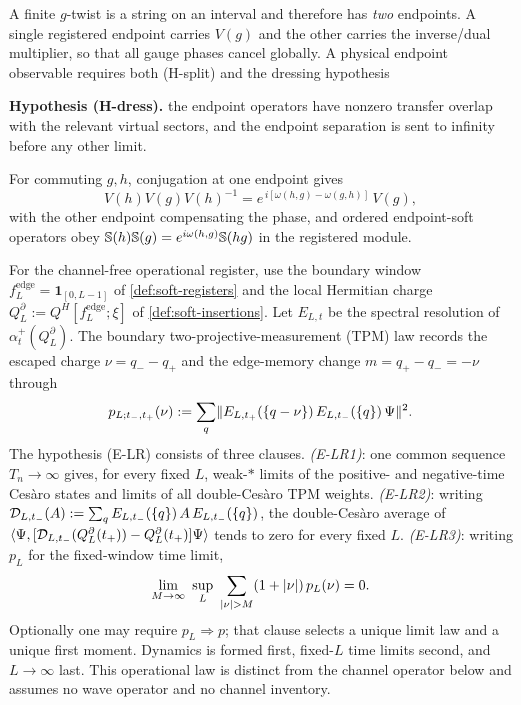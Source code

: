 \begin{definition}\label{def:twist-memory}
A finite $g$-twist is a string on an interval and therefore has \emph{two}
endpoints. A single registered endpoint carries $V(g)$ and the other carries
the inverse/dual multiplier, so that all gauge phases cancel globally. A
physical endpoint observable requires both (H-split) and the dressing
hypothesis

\smallskip
\noindent\textbf{Hypothesis (H-dress).} the endpoint operators have nonzero
transfer overlap with the relevant virtual sectors, and the endpoint
separation is sent to infinity before any other limit.

\smallskip
For commuting $g,h$, conjugation at one endpoint gives
\begin{equation}
  V(h)V(g)V(h)^{-1}=e^{\,i[\omega(h,g)-\omega(g,h)]}\,V(g),
  \label{eq:spt-slant-def}
\end{equation}
with the other endpoint compensating the phase, and ordered endpoint-soft
operators obey $\mathbb{S}(h)\mathbb{S}(g)=e^{i\omega(h,g)}\mathbb{S}(hg)$ in the registered
module.

For the channel-free operational register, use the boundary window
$f^{\mathrm{edge}}_L=\mathbf 1_{[0,L-1]}$ of \cref{def:soft-registers} and the
local Hermitian charge
$Q^{\partial}_{L}:=Q^{H}[f^{\mathrm{edge}}_L;\xi]$ of
\cref{def:soft-insertions}. Let $E_{L,t}$ be the spectral resolution of
$\alpha^{+}_t(Q^{\partial}_{L})$. The boundary two-projective-measurement
(TPM) law records the escaped charge $\nu=q_--q_+$ and the edge-memory change
$m=q_+-q_-=-\nu$ through
\begin{equation}
  p_{L;t_-,t_+}(\nu)
   :=\sum_{q}\lVert E_{L,t_+}(\{q-\nu\})\,E_{L,t_-}(\{q\})\,\Psi\rVert^{2}.
  \label{eq:spt-tpm-law}
\end{equation}
The hypothesis (E-LR) consists of three clauses. \emph{(E-LR1)}: one common
sequence $T_n\to\infty$ gives, for every fixed $L$, weak-$*$ limits of the
positive- and negative-time Ces\`aro states and limits of all double-Ces\`aro
TPM weights. \emph{(E-LR2)}: writing
$\mathcal{D}_{L,t_-}(A):=\sum_q E_{L,t_-}(\{q\})\,A\,E_{L,t_-}(\{q\})$, the
double-Ces\`aro average of
$\langle \Psi,[\mathcal{D}_{L,t_-}(Q^{\partial}_L(t_+))-Q^{\partial}_L(t_+)]\Psi\rangle$
tends to zero for every fixed $L$. \emph{(E-LR3)}: writing $p_L$ for the
fixed-window time limit,
\begin{equation}
  \lim_{M\to\infty}\ \sup_{L}\ \sum_{\abs{\nu}>M}(1+\abs{\nu})\,p_L(\nu)=0 .
  \label{eq:spt-elr3}
\end{equation}
Optionally one may require $p_L\Rightarrow p$; that clause selects a unique
limit law and a unique first moment. Dynamics is formed first, fixed-$L$ time
limits second, and $L\to\infty$ last. This operational law is distinct from
the channel operator below and assumes no wave operator and no channel
inventory.


\end{definition}
